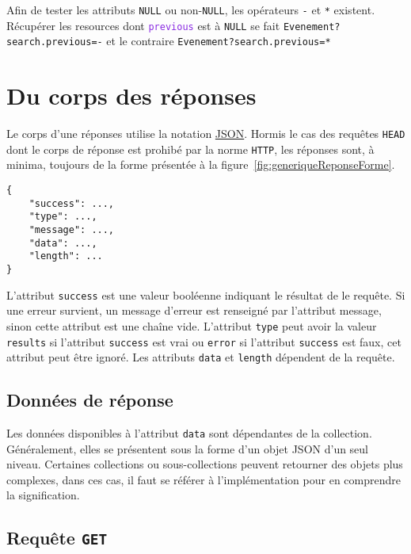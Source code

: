 \documentclass[a4paper,twoside]{article}
\newcommand{\verbe}[1]{\texttt{\textbf{#1}}}
\newcommand{\collection}[1]{\colorbox{light-gray}{\texttt{#1}}}
\newcommand{\attribut}[1]{\textcolor{BlueViolet}{\texttt{#1}}}
\begin{document}
Afin de tester les attributs \texttt{NULL} ou non-\texttt{NULL}, les opérateurs \texttt{-} et \texttt{*} existent. Récupérer les resources dont \attribut{previous} est à \texttt{NULL} se fait \collection{Evenement?search.previous=-} et le contraire \collection{Evenement?search.previous=*}
  
\section{Du corps des réponses}

Le corps d'une réponses utilise la notation \href{https://www.json.org/json-en.html}{JSON}. 
Hormis le cas des requêtes \texttt{HEAD} dont le corps de réponse est prohibé par la norme \texttt{HTTP}, les réponses sont, à minima, toujours de la forme présentée à la figure~\ref{fig:generiqueReponseForme}.
\begin{figure*}
  \caption{Forme générique d'une réponse}
  \label{fig:generiqueReponseForme}
  \begin{verbatim}
{
	"success": ...,
	"type": ...,
	"message": ...,
	"data": ...,
	"length": ...
}
  \end{verbatim}
\end{figure*}

L'attribut \texttt{success} est une valeur booléenne indiquant le résultat de le requête. Si une erreur survient, un message d'erreur est renseigné par l'attribut message, sinon cette attribut est une chaîne vide. L'attribut \texttt{type} peut avoir la valeur \texttt{results} si l'attribut \texttt{success} est vrai ou \texttt{error} si l'attribut \texttt{success} est faux, cet attribut peut être ignoré. Les attributs \texttt{data} et \texttt{length} dépendent de la requête.

\subsection{Données de réponse}

Les données disponibles à l'attribut \texttt{data} sont dépendantes de la collection. Généralement, elles se présentent sous la forme d'un objet JSON d'un seul niveau. Certaines collections ou sous-collections peuvent retourner des objets plus complexes, dans ces cas, il faut se référer à l'implémentation pour en comprendre la signification.

\subsection{Requête \verbe{GET}}
\end{document}
